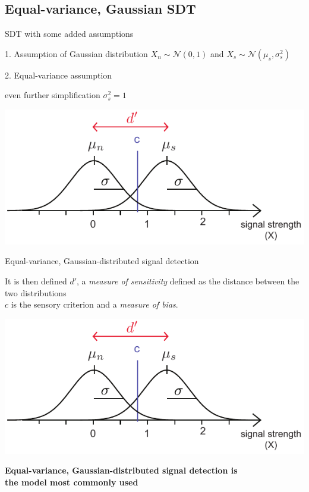 \documentclass[10pt]{beamer}
\begin{document}
\subsection{Equal-variance, Gaussian SDT}
\begin{frame}{SDT with some added assumptions}

\begin{block}{1. Assumption of Gaussian distribution }
$X_n \sim \mathcal{N} (0, 1)$ and 
$X_s \sim \mathcal{N}(\mu_s, \sigma^2_s)$
\end{block}

\begin{block}{2. Equal-variance assumption}

even further simplification $\sigma^2_s =  1$
\end{block}

\begin{center}
\includegraphics[scale=1]{figs/evgsdt.pdf}
\end{center}
\end{frame}

\begin{frame}{Equal-variance, Gaussian-distributed signal detection}
\begin{block}{It is then defined}
$d'$, a \textit{measure of sensitivity} defined as the distance between the two distributions\\
$c$ is the sensory criterion and a \textit{measure of bias}.
\end{block}


\begin{center}
\includegraphics[scale=1]{figs/evgsdt.pdf}
\end{center}

\begin{center}
\vspace{20pt}
\textbf{Equal-variance, Gaussian-distributed signal detection is\\
the model most commonly used}
\end{center}
\end{frame}
\end{document}
